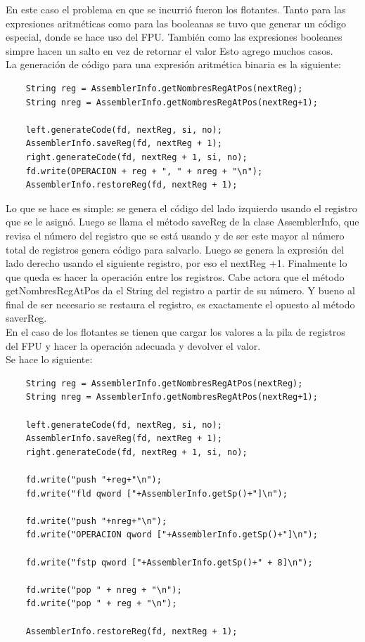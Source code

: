 \documentclass[11pt, spanish]{report}
\begin{document}
En este caso el problema en que se incurri\'o fueron los flotantes. Tanto para las expresiones aritm\'eticas como para las booleanas se tuvo que 
generar un c\'odigo especial, donde se hace uso del FPU. Tambi\'en como las expresiones booleanes simpre hacen un salto en vez de retornar el valor
Esto agrego muchos casos. \\

La generaci\'on de c\'odigo para una expresi\'on aritm\'etica binaria es la siguiente:\\

  \begin{verbatim}
    String reg = AssemblerInfo.getNombresRegAtPos(nextReg);
    String nreg = AssemblerInfo.getNombresRegAtPos(nextReg+1);	

    left.generateCode(fd, nextReg, si, no);		    
	AssemblerInfo.saveReg(fd, nextReg + 1);
	right.generateCode(fd, nextReg + 1, si, no);
	fd.write(OPERACION + reg + ", " + nreg + "\n");		
    AssemblerInfo.restoreReg(fd, nextReg + 1);

  \end{verbatim}

Lo que se hace es simple: se genera el c\'odigo del lado izquierdo usando el registro que se le asign\'o. Luego se llama el m\'etodo saveReg de la 
clase AssemblerInfo, que revisa el n\'umero del registro que se est\'a usando y de ser este mayor al n\'umero total de registros genera c\'odigo para
salvarlo. Luego se genera la expresi\'on del lado derecho usando el siguiente registro, por eso el nextReg +1. Finalmente lo que queda es hacer la operaci\'on entre los registros. Cabe actora que el m\'etodo getNombresRegAtPos da el String del registro a partir de su n\'umero. Y bueno al final
de ser necesario se restaura el registro, es exactamente el opuesto al m\'etodo saverReg.\\

En el caso de los flotantes se tienen que cargar los valores a la pila de registros del FPU y hacer la operaci\'on adecuada y devolver el valor.\\

Se hace lo siguiente:\\

  \begin{verbatim}
    String reg = AssemblerInfo.getNombresRegAtPos(nextReg);
    String nreg = AssemblerInfo.getNombresRegAtPos(nextReg+1);	

	left.generateCode(fd, nextReg, si, no);		    
	AssemblerInfo.saveReg(fd, nextReg + 1);
	right.generateCode(fd, nextReg + 1, si, no);
			
	fd.write("push "+reg+"\n");
	fd.write("fld qword ["+AssemblerInfo.getSp()+"]\n");
		
	fd.write("push "+nreg+"\n");
	fd.write("OPERACION qword ["+AssemblerInfo.getSp()+"]\n");
			
	fd.write("fstp qword ["+AssemblerInfo.getSp()+" + 8]\n");
		    
	fd.write("pop " + nreg + "\n");
	fd.write("pop " + reg + "\n");
		    
	AssemblerInfo.restoreReg(fd, nextReg + 1);

  \end{verbatim}
\end{document}
